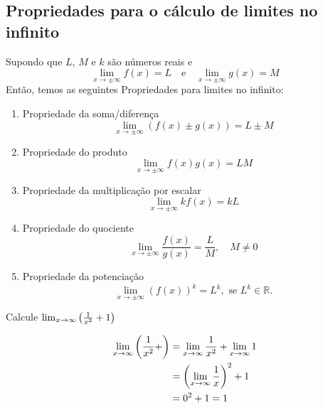 \cleardoublepage\documentclass[../main.tex]{subfiles}
\begin{document}
\subsection{Propriedades para o cálculo de limites no infinito}\label{subsec:lim_Propriedades_xinf}
Supondo que $L$, $M$ e $k$ são números reais e
\begin{equation*}
  \lim_{x\to \pm\infty} f(x) = L\quad\text{e}\quad\lim_{x\to\pm\infty}g(x) = M
\end{equation*}
Então, temos as seguintes Propriedades para limites no infinito:
\begin{enumerate}[P1.]
\item Propriedade da soma/diferença
  \begin{equation*}
    \lim_{x\to\pm\infty} (f(x)\pm g(x)) = L\pm M
  \end{equation*}
\item Propriedade do produto
  \begin{equation*}
    \lim_{x\to\pm\infty} f(x)g(x) = LM
  \end{equation*}
\item Propriedade da multiplicação por escalar
  \begin{equation*}
    \lim_{x\to\pm\infty} kf(x) = kL
  \end{equation*}
\item Propriedade do quociente
  \begin{equation*}
    \lim_{x\to\pm\infty} \frac{f(x)}{g(x)} = \frac{L}{M},\quad M\neq 0
  \end{equation*}
\item Propriedade da potenciação
  \begin{equation*}
    \lim_{x\to\pm\infty} (f(x))^k = L^k,\text{ se } L^k\in\mathbb{R}.
  \end{equation*}
\end{enumerate}

\begin{ex}
Calcule $ \lim_{x\to \infty} \left(\frac{1}{x^2}+1\right)$\\
\begin{solution}
    \begin{align*}
    \lim_{x\to \infty} \left(\frac{1}{x^2}+\right) &= \lim_{x\to \infty} \frac{1}{x^2} + \lim_{x\to \infty}1 \\
                                       &= \left(\lim_{x\to\infty} \frac{1}{x}\right)^2 + 1\\
                                       &= 0^2 + 1 = 1
\end{align*}
\end{solution}
\end{ex}
\end{document}
